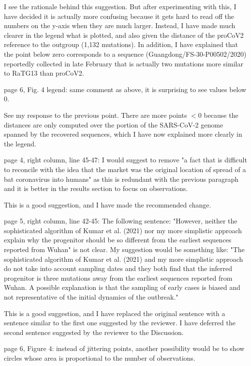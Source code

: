 \documentclass[11pt, oneside]{article}   	%
\newcommand{\response}[1]{{\color{black}#1}}
\begin{document}
\response{I see the rationale behind this suggestion. But after experimenting with this, I have decided it is actually more confusing because it gets hard to read off the numbers on the y-axis when they are much larger. Instead, I have made much clearer in the legend what is plotted, and also given the distance of the proCoV2 reference to the outgroup (1,132 mutations). In addition, I have explained that the point below zero corresponds to a sequence (Guangdong/FS-30-P00502/2020) reportedly collected in late February that is actually two mutations more similar to RaTG13 than proCoV2.}

page 6, Fig. 4 legend: same comment as above, it is surprising to see values below 0. 

\response{See my response to the previous point. There are more points $< 0$ because the distances are only computed over the portion of the SARS-CoV-2 genome spanned by the recovered sequences, which I have now explained more clearly in the legend.}

page 4, right column, line 45-47: I would suggest to remove "a fact that is difficult to reconcile with the idea that the market was the original location of spread of a bat coronavirus into humans" as this is redundant with the previous paragraph and it is better in the results section to focus on observations.

\response{This is a good suggestion, and I have made the recommended change.}

page 5, right column, line 42-45: The following sentence: "However, neither the sophisticated algorithm of Kumar et al. (2021) nor my more simplistic approach explain why the progenitor should be so different from the earliest sequences reported from Wuhan" is not clear. My suggestion would be something like: "The sophisticated algorithm of Kumar et al. (2021) and my more simplistic approach do not take into account sampling dates and they both find that the inferred progenitor is three mutations away from the earliest sequences reported from Wuhan. A possible explanation is that the sampling of early cases is biased and not representative of the initial dynamics of the outbreak."

\response{This is a good suggestion, and I have replaced the original sentence with a sentence similar to the first one suggested by the reviewer. I have deferred the second sentence suggested by the reviewer to the Discussion.}

page 6, Figure 4: instead of jittering points, another possibility would be to show circles whose area is proportional to the number of observations.
\end{document}
